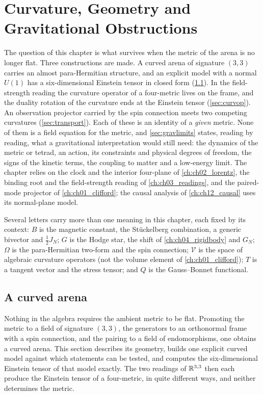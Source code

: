 \chapter{Curvature, Geometry and Gravitational Obstructions}
\label{ch:ch11_curvature}

The question of this chapter is what survives when the metric of the arena is no longer flat. Three constructions are made. A curved
arena of signature $(3,3)$ carries an almost para-Hermitian structure, and an explicit model with a normal $U(1)$ has a six-dimensional
Einstein tensor in closed form (\cref{sec:curved}). In the field-strength reading the curvature operator of a four-metric lives on the frame,
and the duality rotation of the curvature ends at the Einstein tensor (\cref{sec:curvop}). An observation projector carried by the spin
connection meets two competing curvatures (\cref{sec:transport}). Each of these is an identity of a \emph{given} metric. None of them is a
field equation for the metric, and \cref{sec:gravlimits} states, reading by reading, what a gravitational interpretation would still need: the
dynamics of the metric or tetrad, an action, its constraints and physical degrees of freedom, the signs of the kinetic terms, the coupling to
matter and a low-energy limit. The chapter relies on the clock and the interior four-plane of \cref{ch:ch02_lorentz}, the binding root and
the field-strength reading of \cref{ch:ch03_readings}, and the paired-mode projector of \cref{ch:ch01_clifford}; the causal analysis of
\cref{ch:ch12_causal} uses its normal-plane model.

Several letters carry more than one meaning in this chapter, each fixed by its context: $B$ is the magnetic constant, the St\"uckelberg combination, a
generic bivector and $\tfrac12J_N$; $G$ is the Hodge star, the shift of \cref{ch:ch04_rigidbody} and $G_N$; $\Omega$ is the para-Hermitian two-form and the spin
connection; $\mathcal V$ is the space of algebraic curvature operators (not the volume element of \cref{ch:ch01_clifford}); $T$ is a tangent vector and the
stress tensor; and $Q$ is the Gauss--Bonnet functional.



\section{A curved arena}
\label{sec:curved}

Nothing in the algebra requires the ambient metric to be flat. Promoting the metric to a field of signature $(3,3)$, the generators to an
orthonormal frame with a spin connection, and the pairing to a field of endomorphisms, one obtains a curved arena. This section describes its
geometry, builds one explicit curved model against which statements can be tested, and computes the six-dimensional Einstein tensor of that
model exactly. The two readings of $\mathbb{R}^{3,3}$ then each produce the Einstein tensor of a four-metric, in quite different ways, and neither
determines the metric.

